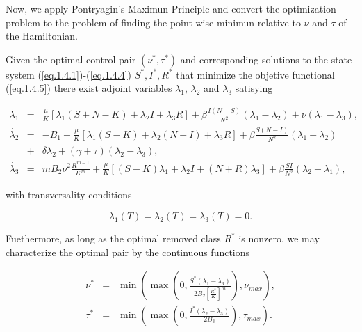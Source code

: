Now, we apply Pontryagin's Maximun Principle and convert the optimization problem to the problem of finding the point-wise minimun relative to $\nu$ and $\tau$ of the Hamiltonian.

\begin{theorem}
Given the optimal control pair $(\nu^*,\tau^*)$ and corresponding solutions to the state system (\ref{eq.1.4.1})-(\ref{eq.1.4.4}) $S^*,I^*,R^*$ that minimize the objetive functional (\ref{eq.1.4.5}) there exist adjoint variables $\lambda_1$, $\lambda_2$ and $\lambda_3$ satisying

\begin{eqnarray}\label{eq.1.4.adj}
\dot{\lambda_1}&=& \frac{\mu}{K}[\lambda_1(S+N-K)+\lambda_2 I+\lambda_3 R]+\beta \frac{I(N-S)}{N^2}(\lambda_1-\lambda_2)+\nu(\lambda_1-\lambda_3), \label{eq.1.4.10}\\
\dot{\lambda_2}&=& -B_1+\frac{\mu}{K}[\lambda_1(S-K)+\lambda_2(N+I)+\lambda_3 R]+\beta\frac{S(N-I)}{N^2}(\lambda_1-\lambda_2)\nonumber\\
&+&\delta \lambda_2+(\gamma+\tau)(\lambda_2-\lambda_3),\label{eq.1.4.11}\\
\dot{\lambda_3}&=& mB_2 \nu^2\frac{R^{m-1}}{K^m}+\frac{\mu}{K}[(S-K)\lambda_1 +\lambda_2 I+(N+R)\lambda_3]+\beta \frac{SI}{N^2}(\lambda_2-\lambda_1),\label{eq.1.4.12}
\end{eqnarray}

with transversality conditions

\begin{equation}\label{eq.1.4.13}
\lambda_1(T)=\lambda_2(T)=\lambda_3(T)=0.
\end{equation}

Fuethermore, as long as the optimal removed class $R^*$ is nonzero, we may characterize the optimal pair by the continuous functions

\begin{eqnarray}
\nu^*&=&\min \left(\max\left(0,\frac{S^*(\lambda_1-\lambda_3)}{2B_2[\frac{R^*}{K}]^m}\right),\nu_{max}\right),\nonumber\\
\tau^*&=&\min \left(\max\left(0,\frac{I^*(\lambda_2-\lambda_3)}{2B_3}\right),\tau_{max}\right) \label{eq.1.4.14}.
\end{eqnarray}
\end{theorem}

